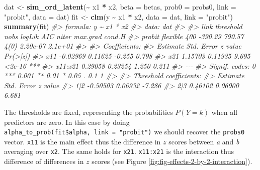 \documentclass[
  man,floatsintext]{apa6}
\newenvironment{Shaded}{\begin{snugshade}}{\end{snugshade}}
\newcommand{\AttributeTok}[1]{\textcolor[rgb]{0.13,0.29,0.53}{#1}}
\newcommand{\CommentTok}[1]{\textcolor[rgb]{0.56,0.35,0.01}{\textit{#1}}}
\newcommand{\FunctionTok}[1]{\textcolor[rgb]{0.13,0.29,0.53}{\textbf{#1}}}
\newcommand{\NormalTok}[1]{#1}
\newcommand{\OtherTok}[1]{\textcolor[rgb]{0.56,0.35,0.01}{#1}}
\newcommand{\SpecialCharTok}[1]{\textcolor[rgb]{0.81,0.36,0.00}{\textbf{#1}}}
\newcommand{\StringTok}[1]{\textcolor[rgb]{0.31,0.60,0.02}{#1}}
\begin{document}
\begin{Shaded}
\begin{Highlighting}[]
\NormalTok{dat }\OtherTok{\textless{}{-}} \FunctionTok{sim\_ord\_latent}\NormalTok{(}\SpecialCharTok{\textasciitilde{}}\NormalTok{ x1 }\SpecialCharTok{*}\NormalTok{ x2, }\AttributeTok{beta =}\NormalTok{ betas, }\AttributeTok{prob0 =}\NormalTok{ probs0, }\AttributeTok{link =} \StringTok{"probit"}\NormalTok{, }\AttributeTok{data =}\NormalTok{ dat)}
\NormalTok{fit }\OtherTok{\textless{}{-}} \FunctionTok{clm}\NormalTok{(y }\SpecialCharTok{\textasciitilde{}}\NormalTok{ x1 }\SpecialCharTok{*}\NormalTok{ x2, }\AttributeTok{data =}\NormalTok{ dat, }\AttributeTok{link =} \StringTok{"probit"}\NormalTok{)}
\FunctionTok{summary}\NormalTok{(fit)}
\CommentTok{\#\textgreater{} formula: y \textasciitilde{} x1 * x2}
\CommentTok{\#\textgreater{} data:    dat}
\CommentTok{\#\textgreater{} }
\CommentTok{\#\textgreater{}  link   threshold nobs logLik  AIC    niter max.grad cond.H }
\CommentTok{\#\textgreater{}  probit flexible  400  {-}390.29 790.57 4(0)  2.20e{-}07 2.1e+01}
\CommentTok{\#\textgreater{} }
\CommentTok{\#\textgreater{} Coefficients:}
\CommentTok{\#\textgreater{}         Estimate Std. Error z value Pr(\textgreater{}|z|)    }
\CommentTok{\#\textgreater{} x11     {-}0.02969    0.11625  {-}0.255    0.798    }
\CommentTok{\#\textgreater{} x21      1.15703    0.11935   9.695   \textless{}2e{-}16 ***}
\CommentTok{\#\textgreater{} x11:x21  0.29058    0.23254   1.250    0.211    }
\CommentTok{\#\textgreater{} {-}{-}{-}}
\CommentTok{\#\textgreater{} Signif. codes:  0 \textquotesingle{}***\textquotesingle{} 0.001 \textquotesingle{}**\textquotesingle{} 0.01 \textquotesingle{}*\textquotesingle{} 0.05 \textquotesingle{}.\textquotesingle{} 0.1 \textquotesingle{} \textquotesingle{} 1}
\CommentTok{\#\textgreater{} }
\CommentTok{\#\textgreater{} Threshold coefficients:}
\CommentTok{\#\textgreater{}     Estimate Std. Error z value}
\CommentTok{\#\textgreater{} 1|2 {-}0.50503    0.06932  {-}7.286}
\CommentTok{\#\textgreater{} 2|3  0.46102    0.06900   6.681}
\end{Highlighting}
\end{Shaded}

\normalsize

The thresholds are fixed, representing the probabilities \(P(Y = k)\) when all predictors are zero. In this case by doing \texttt{alpha\_to\_prob(fit\$alpha,\ link\ =\ "probit")} we should recover the \texttt{probs0} vector. \texttt{x11} is the main effect thus the difference in \(z\) scores between \emph{a} and \emph{b} averaging over \texttt{x2}. The same holds for \texttt{x21}. \texttt{x11:x21} is the interaction thus difference of differences in \(z\) scores (see Figure \ref{fig:fig-effects-2-by-2-interaction}).
\end{document}
